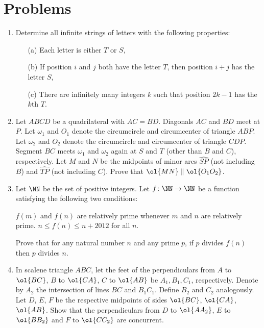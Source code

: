 \documentclass[11pt]{scrartcl}
\begin{document}
\section{Problems}
\begin{enumerate}[\bfseries 1.]
\item %
Determine all infinite strings of letters with the following properties:
\begin{enumerate}
  \item[(a)] Each letter is either $T$ or $S$,
  \item[(b)] If position $i$ and $j$ both have the letter $T$,
    then position $i+j$ has the letter $S$,
  \item[(c)] There are infinitely many integers $k$ such that position $2k-1$ has the $k$th $T$.
\end{enumerate}

\item %
Let $ABCD$ be a quadrilateral with $AC = BD$.
Diagonals $AC$ and $BD$ meet at $P$.
Let $\omega_1$ and $O_1$ denote the circumcircle and
circumcenter of triangle $ABP$.
Let $\omega_2$ and $O_2$ denote the circumcircle and
circumcenter of triangle $CDP$.
Segment $BC$ meets $\omega_1$ and $\omega_2$ again at $S$ and $T$
(other than $B$ and $C$), respectively.
Let $M$ and $N$ be the midpoints of minor arcs
$\widehat {SP}$ (not including $B$)
and $\widehat {TP}$ (not including $C$).
Prove that $\ol{MN} \parallel \ol{O_1O_2}$.

\item %
Let $\NN$ be the set of positive integers.
Let $f \colon \NN \to \NN$ be a function satisfying the following two conditions:
\begin{enumerate}[(a)]
 \ii $f(m)$ and $f(n)$ are relatively prime whenever $m$ and $n$ are relatively prime.
 \ii $n \le f(n) \le n+2012$ for all $n$.
\end{enumerate}
Prove that for any natural number $n$ and any prime $p$,
if $p$ divides $f(n)$ then $p$ divides $n$.

\item %
In scalene triangle $ABC$, let the feet of the perpendiculars
from $A$ to $\ol{BC}$, $B$ to $\ol{CA}$, $C$ to $\ol{AB}$
be $A_1, B_1, C_1$, respectively.
Denote by $A_2$ the intersection of lines $BC$ and $B_1C_1$.
Define $B_2$ and $C_2$ analogously.
Let $D$, $E$, $F$ be the respective midpoints
of sides $\ol{BC}$, $\ol{CA}$, $\ol{AB}$.
Show that the perpendiculars from $D$ to $\ol{AA_2}$,
$E$ to $\ol{BB_2}$ and $F$ to $\ol{CC_2}$ are concurrent.


\end{enumerate}
\end{document}
